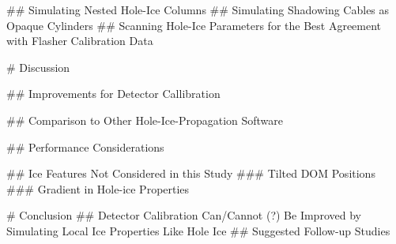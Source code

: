 
## Simulating Nested Hole-Ice Columns
## Simulating Shadowing Cables as Opaque Cylinders
## Scanning Hole-Ice Parameters for the Best Agreement with Flasher Calibration Data

# Discussion

## Improvements for Detector Callibration

## Comparison to Other Hole-Ice-Propagation Software

## Performance Considerations

## Ice Features Not Considered in this Study
### Tilted DOM Positions
### Gradient in Hole-ice Properties

# Conclusion
## Detector Calibration Can/Cannot (?) Be Improved by Simulating Local Ice Properties Like Hole Ice
## Suggested Follow-up Studies
